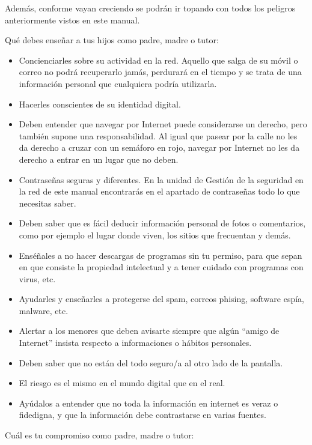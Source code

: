 \documentclass[
  a4paper,
  openany]{book}
\begin{document}
Además, conforme vayan creciendo se podrán ir topando con todos los peligros anteriormente vistos en este manual.

Qué debes enseñar a tus hijos como padre, madre o tutor:

\begin{itemize}
\item
  Concienciarles sobre su actividad en la red. Aquello que salga de su móvil o correo no podrá recuperarlo jamás, perdurará en el tiempo y se trata de una información personal que cualquiera podría utilizarla.
\item
  Hacerles conscientes de su identidad digital.
\item
  Deben entender que navegar por Internet puede considerarse un derecho, pero también supone una responsabilidad. Al igual que pasear por la calle no les da derecho a cruzar con un semáforo en rojo, navegar por Internet no les da derecho a entrar en un lugar que no deben.
\item
  Contraseñas seguras y diferentes. En la unidad de Gestión de la seguridad en la red de este manual encontrarás en el apartado de contraseñas todo lo que necesitas saber.
\item
  Deben saber que es fácil deducir información personal de fotos o comentarios, como por ejemplo el lugar donde viven, los sitios que frecuentan y demás.
\item
  Enséñales a no hacer descargas de programas sin tu permiso, para que sepan en que consiste la propiedad intelectual y a tener cuidado con programas con virus, etc.
\item
  Ayudarles y enseñarles a protegerse del spam, correos phising, software espía, malware, etc.
\item
  Alertar a los menores que deben avisarte siempre que algún ``amigo de Internet'' insista respecto a informaciones o hábitos personales.
\item
  Deben saber que no están del todo seguro/a al otro lado de la pantalla.
\item
  El riesgo es el mismo en el mundo digital que en el real.
\item
  Ayúdalos a entender que no toda la información en internet es veraz o fidedigna, y que la información debe contrastarse en varias fuentes.
\end{itemize}

Cuál es tu compromiso como padre, madre o tutor:
\end{document}
